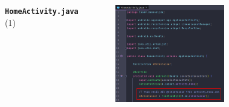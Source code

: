 \documentclass{beamer}
\begin{document}
\begin{frame}
\begin{columns}
\begin{figure}
        \end{figure}
        \indent \textbf{\texttt{HomeActivity.java}} (1)
        \begin{figure}
            \centering
            \includegraphics[width=\textwidth]{images/22.png}
        \end{figure}
    \end{columns}
\end{frame}
\end{document}
